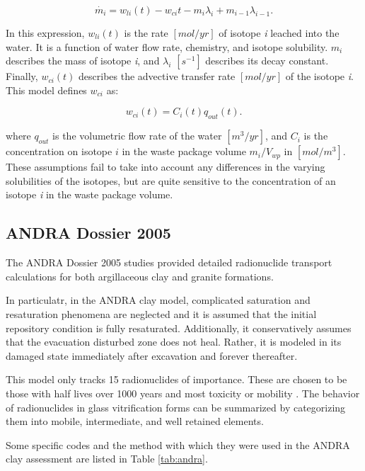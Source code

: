 {\begin{equation}
\dot{m_i}=w_{li}(t)-w_{ci}{t}-m_i\lambda_i+m_{i-1}\lambda_{i-1}.\nonumber
\end{equation}

In this expression, $w_{li}(t)$ is the rate $[mol/yr]$ of isotope \emph{i}
leached into the water.  It is a function of water flow rate, chemistry, and
isotope solubility. $m_i$ describes the mass of isotope \emph{i}, and
$\lambda_i$ $[s^{-1}]$ describes its decay constant. Finally, $w_{ci}(t)$
describes the advective transfer rate $[mol/yr]$ of the isotope \emph{i}. This 
model defines $w_{ci}$ as:

\begin{equation}
  w_{ci}(t)=C_i(t)q_{out}(t). 
\end{equation}

where $q_{out}$ is the volumetric flow rate of the water $[m^3/yr]$, and 
$C_i$ is the concentration on isotope $i$ in the waste package volume 
$m_i/V_{wp}$ in $[mol/m^3]$. These assumptions fail to take into account any
differences in the varying solubilities of the isotopes, but are quite
sensitive to the concentration of an isotope \emph{i} in the waste package
volume.  

\subsection{ANDRA Dossier 2005} The ANDRA Dossier 2005 studies provided
detailed radionuclide transport calculations for both argillaceous clay and granite
formations. 

In particulatr, in the \gls{ANDRA} clay model, complicated saturation and 
resaturation phenomena are neglected and it is assumed that the initial 
repository condition is fully resaturated. Additionally, it conservatively 
assumes that the evacuation disturbed zone does not heal. Rather, it is modeled 
in its damaged state immediately after excavation and forever thereafter.

This model only tracks 15 radionuclides of importance.  These are chosen to be those
with half lives over 1000 years and most toxicity or mobility
\cite{andra_argile:_2005}. The behavior of radionuclides in 
glass vitrification forms can be summarized by categorizing them into mobile,
intermediate, and well retained elements. 

Some specific codes and the method with which they were used in the \gls{ANDRA} 
clay assessment are listed in Table  \ref{tab:andra}.

}

